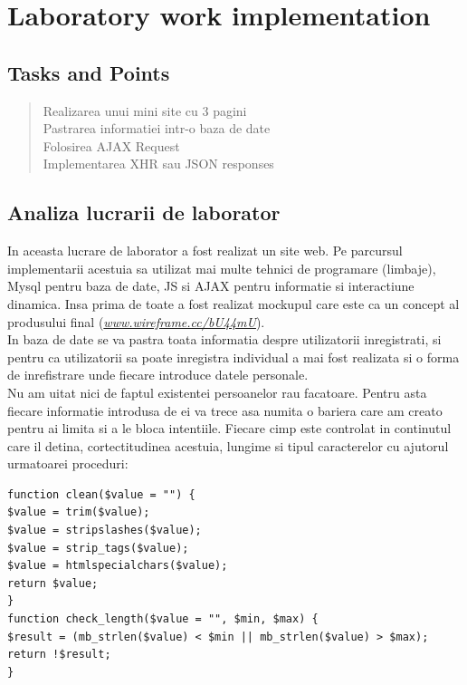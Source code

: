 \section{Laboratory work implementation}

\subsection{Tasks and Points}

\begin{quote}
\begin{description}

	Realizarea unui mini site cu 3 pagini \\
	Pastrarea informatiei intr-o baza de date\\
	Folosirea AJAX Request\\
	Implementarea XHR sau JSON responses\\

\end{description}
\end{quote}

\subsection{Analiza lucrarii de laborator}

In aceasta lucrare de laborator a fost realizat un site web. Pe parcursul implementarii acestuia sa utilizat mai multe tehnici de programare (limbaje), Mysql pentru baza de date, JS si AJAX pentru informatie si interactiune dinamica.
Insa prima de toate a fost realizat mockupul care este ca un concept al produsului final (\emph{\url{www.wireframe.cc/bU44mU}}). \\
In baza de date se va pastra toata informatia despre utilizatorii inregistrati, si pentru ca utilizatorii sa poate inregistra individual a mai fost realizata si o forma de inrefistrare unde fiecare introduce datele personale. \\
Nu am uitat nici de faptul existentei persoanelor rau facatoare. Pentru asta fiecare informatie introdusa de ei va trece asa numita o bariera care am creato pentru ai limita si a le bloca intentiile. Fiecare cimp este controlat in continutul care il detina, cortectitudinea acestuia, lungime si tipul caracterelor cu ajutorul urmatoarei proceduri:
\begin{verbatim}
function clean($value = "") {
$value = trim($value);
$value = stripslashes($value);
$value = strip_tags($value);
$value = htmlspecialchars($value);
return $value;
}
function check_length($value = "", $min, $max) {
$result = (mb_strlen($value) < $min || mb_strlen($value) > $max);
return !$result;
}
\end{verbatim}

